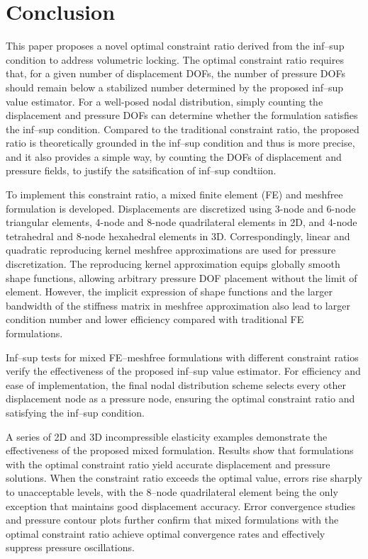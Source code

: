 \section{Conclusion}

This paper proposes a novel optimal constraint ratio derived from the inf--sup condition to address volumetric locking. The optimal constraint ratio requires that, for a given number of displacement DOFs, the number of pressure DOFs should remain below a stabilized number determined by the proposed inf--sup value estimator. For a well-posed nodal distribution, simply counting the displacement and pressure DOFs can determine whether the formulation satisfies the inf--sup condition. Compared to the traditional constraint ratio, the proposed ratio is theoretically grounded in the inf--sup condition and thus is more precise,
and it also provides a simple way, by counting the DOFs of displacement and pressure fields, to justify the satsification of inf--sup condtiion.

To implement this constraint ratio, a mixed finite element (FE) and meshfree formulation is developed. Displacements are discretized using 3-node and 6-node triangular elements, 4-node and 8-node quadrilateral elements in 2D, and 4-node tetrahedral and 8-node hexahedral elements in 3D. Correspondingly, linear and quadratic reproducing kernel meshfree approximations are used for pressure discretization. The reproducing kernel approximation equips globally smooth shape functions, allowing arbitrary pressure DOF placement without the limit of element.
However, the implicit expression of shape functions and the larger bandwidth of the stiffness matrix in meshfree approximation also lead to larger condition number and lower efficiency compared with traditional FE formulations.

Inf--sup tests for mixed FE--meshfree formulations with different constraint ratios verify the effectiveness of the proposed inf--sup value estimator. For efficiency and ease of implementation, the final nodal distribution scheme selects every other displacement node as a pressure node, ensuring the optimal constraint ratio and satisfying the inf--sup condition.

A series of 2D and 3D incompressible elasticity examples demonstrate the effectiveness of the proposed mixed formulation. Results show that formulations with the optimal constraint ratio yield accurate displacement and pressure solutions. When the constraint ratio exceeds the optimal value, errors rise sharply to unacceptable levels, with the 8--node quadrilateral element being the only exception that maintains good displacement accuracy. Error convergence studies and pressure contour plots further confirm that mixed formulations with the optimal constraint ratio achieve optimal convergence rates and effectively suppress pressure oscillations.
